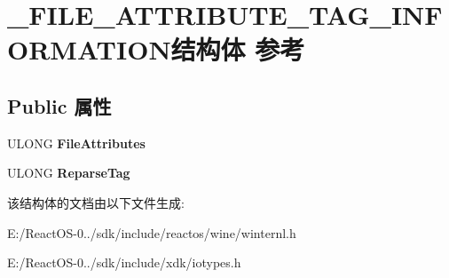 \hypertarget{struct___f_i_l_e___a_t_t_r_i_b_u_t_e___t_a_g___i_n_f_o_r_m_a_t_i_o_n}{}\section{\+\_\+\+F\+I\+L\+E\+\_\+\+A\+T\+T\+R\+I\+B\+U\+T\+E\+\_\+\+T\+A\+G\+\_\+\+I\+N\+F\+O\+R\+M\+A\+T\+I\+O\+N结构体 参考}
\label{struct___f_i_l_e___a_t_t_r_i_b_u_t_e___t_a_g___i_n_f_o_r_m_a_t_i_o_n}
\subsection*{Public 属性}
\begin{DoxyCompactItemize}
\item 
\mbox{\label{struct___f_i_l_e___a_t_t_r_i_b_u_t_e___t_a_g___i_n_f_o_r_m_a_t_i_o_n_a3792dd92f831b6588620069a903ab7b4}} 
U\+L\+O\+NG {\bfseries File\+Attributes}
\item 
\mbox{\label{struct___f_i_l_e___a_t_t_r_i_b_u_t_e___t_a_g___i_n_f_o_r_m_a_t_i_o_n_a737877cfcdf456935236c8919efc14ad}} 
U\+L\+O\+NG {\bfseries Reparse\+Tag}
\end{DoxyCompactItemize}


该结构体的文档由以下文件生成\+:\begin{DoxyCompactItemize}
\item 
E\+:/\+React\+O\+S-\/0../sdk/include/reactos/wine/winternl.\+h\item 
E\+:/\+React\+O\+S-\/0../sdk/include/xdk/iotypes.\+h\end{DoxyCompactItemize}
